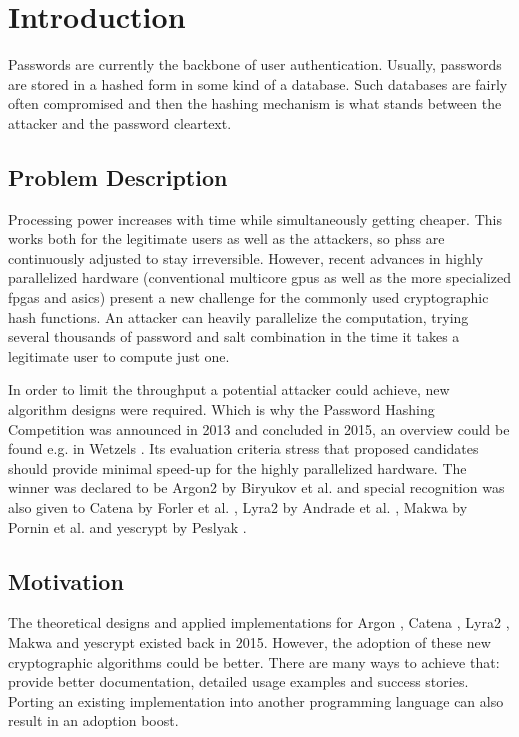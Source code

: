 \chapter{Introduction}
\label{sec:introduction}
Passwords are currently the backbone of user authentication. Usually, passwords are stored in a hashed form in some kind of a database. Such databases are fairly often compromised and then the hashing mechanism is what stands between the attacker and the password cleartext.

\section{Problem Description}
Processing power increases with time while simultaneously getting cheaper. This works both for the legitimate users as well as the attackers, so \glspl{phs} are continuously adjusted to stay irreversible. However, recent advances in highly parallelized hardware (conventional multicore \glspl{gpu} as well as the more specialized \glspl{fpga} and \glspl{asic}) present a new challenge for the commonly used cryptographic hash functions. An attacker can heavily parallelize the computation, trying several thousands of password and salt combination in the time it takes a legitimate user to compute just one.

In order to limit the throughput a potential attacker could achieve, new algorithm designs were required. Which is why the Password Hashing Competition was announced in 2013 and concluded in 2015, an overview could be found e.g. in Wetzels \cite{wetzels:2016:phc}. Its evaluation criteria stress that proposed candidates should provide minimal speed-up for the highly parallelized hardware. The winner was declared to be Argon2 by Biryukov et al. \cite{biryukov:2015:argon2} and special recognition was also given to Catena by Forler et al. \cite{forler:2013:catena}, Lyra2 by Andrade et al. \cite{andrade:2016:lyra2,marcos:2015:lyra2}, Makwa by Pornin et al. \cite{pornin:2015:makwa} and yescrypt by Peslyak \cite{peslyak:2015:yescrypt}.

\section{Motivation}
The theoretical designs and applied implementations for Argon \cite{biryukov:2015:argon2}, Catena \cite{forler:2013:catena}, Lyra2 \cite{andrade:2016:lyra2,marcos:2015:lyra2}, Makwa \cite{pornin:2015:makwa} and yescrypt \cite{peslyak:2015:yescrypt} existed back in 2015. However, the adoption of these new cryptographic algorithms could be better. There are many ways to achieve that: provide better documentation, detailed usage examples and success stories. Porting an existing implementation into another programming language can also result in an adoption boost.

